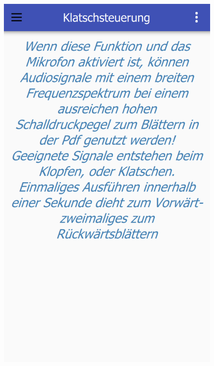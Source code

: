 \newpage
    

\begin{figure}[ht!]
	\centering
	\begin{minipage}{0.31\linewidth}
		\centering
		\includegraphics[scale=0.5]{GUI/Bilder/Klatschsteuerung.PNG}
	\end{minipage}
	\begin{minipage}{0.31\linewidth}
		\centering

\end{minipage}
\end{figure}
